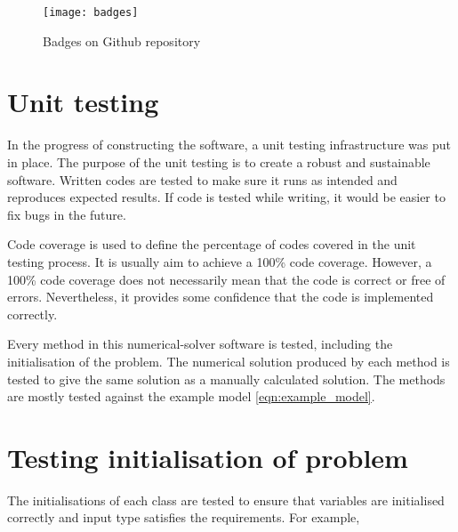 \begin{figure}
    \texttt{[image: badges]}
    \caption{Badges on Github repository}
    \label{fig:badges}
 \end{figure}

\section{Unit testing}
\label{sec:testing}
In the progress of constructing the software, a unit testing infrastructure was put in place. The purpose of the unit testing is to create a robust and sustainable software. Written codes are tested to make sure it runs as intended and reproduces expected results. If code is tested while writing, it would be easier to fix bugs in the future. 

Code coverage is used to define the percentage of codes covered in the unit testing process. It is usually aim to achieve a 100\% code coverage. However, a 100\% code coverage does not necessarily mean that the code is correct or free of errors. Nevertheless, it provides some confidence that the code is implemented correctly.

Every method in this numerical-solver software is tested, including the initialisation of the problem. The numerical solution produced by each method is tested to give the same solution as a manually calculated solution. The methods are mostly tested against the example model \ref{eqn:example_model}.

\section{Testing initialisation of problem}
The initialisations of each class are tested to ensure that variables are initialised correctly and input type satisfies the requirements. For example, 


